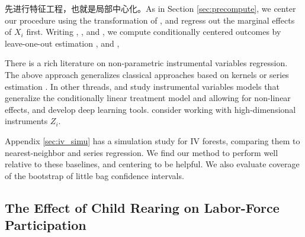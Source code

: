 \documentclass[aos]{imsart}
\theoremstyle{plain}
\theoremstyle{definition}
\theoremstyle{remark}
\begin{document}
\begin{CJK}{UTF8}{gbsn}
先进行特征工程，也就是局部中心化。As in Section \ref{sec:precompute}, we center our procedure using the transformation of \citet{robinson1988root}, and regress out the marginal effects of $X_i$ first. Writing
,
, and
,
we compute conditionally centered outcomes by leave-one-out estimation
,
 and
,

There is a rich literature on non-parametric instrumental variables regression. The above approach
generalizes classical approaches based on kernels or series estimation
\citep{abadie2003semiparametric,su2013local,wooldridge2010econometric}. In other threads,
\citet{darolles2011nonparametric} and \citet{newey2003instrumental} study instrumental variables
models that generalize the conditionally linear treatment model and allowing for non-linear
effects, and \citet{hartford2016counterfactual} develop deep learning tools.
\citet{belloni2012sparse} consider working with high-dimensional instruments $Z_i$.

Appendix \ref{sec:iv_simu} has a simulation study for IV forests, comparing
them to nearest-neighbor and series regression. We find our method to perform well relative to these
baselines, and centering to be helpful. We also evaluate
coverage of the bootstrap of little bag confidence intervals.

\subsection{The Effect of Child Rearing on Labor-Force Participation}
\label{sec:angrist_evans}


\end{CJK}
\end{document}

